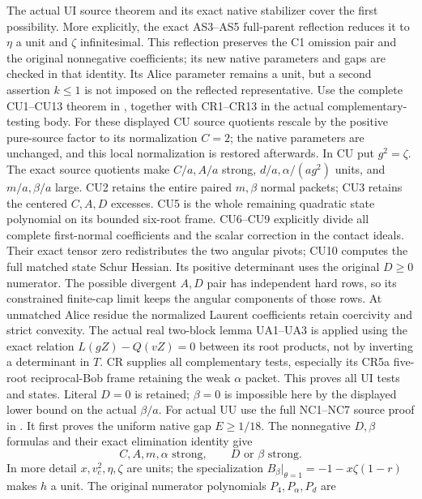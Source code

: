 The actual UI source theorem and its exact native stabilizer cover
the first possibility.  More explicitly, the exact AS3--AS5
full-parent reflection reduces it to \(\eta\) a unit and
\(\zeta\) infinitesimal.  This reflection preserves the C1 omission
pair and the original nonnegative coefficients; its new native
parameters and gaps are checked in that identity.  Its Alice
parameter remains a unit, but a second assertion \(k\leq1\) is
not imposed on the reflected representative.
Use the complete CU1--CU13 theorem in
, together with CR1--CR13 in the actual
complementary-testing body.  For these displayed CU source
quotients rescale by the positive pure-source factor to its
normalization \(C=2\); the native parameters are unchanged,
and this local normalization is restored afterwards.
In CU put \(g^2=\zeta\).
The exact source quotients make \(C/a,A/a\) strong,
\(d/a,\alpha/(ag^2)\) units, and \(m/a,\beta/a\) large.
CU2 retains the entire paired \(m,\beta\) normal packets;
CU3 retains the centered \(C,A,D\) excesses.
CU5 is the whole remaining quadratic state polynomial on
its bounded six-root frame.  CU6--CU9 explicitly divide all
complete first-normal coefficients and the scalar correction in the
contact ideals.  Their exact tensor zero redistributes the
two angular pivots; CU10 computes the full matched state
Schur Hessian.  Its positive determinant uses the original
\(D\geq0\) numerator.  The possible divergent \(A,D\) pair has
independent hard rows, so its constrained finite-cap limit
keeps the angular components of those rows.
At unmatched Alice residue the normalized Laurent coefficients
retain coercivity and strict convexity.  The actual real
two-block lemma UA1--UA3 is applied using the exact relation
\(L(gZ)-Q(vZ)=0\) between its root products, not by inverting
a determinant in \(T\).  CR supplies all complementary tests,
especially its CR5a five-root reciprocal-Bob frame retaining
the weak \(\alpha\) packet.  This proves all UI tests and states.
Literal \(D=0\) is retained; \(\beta=0\) is impossible here by
the displayed lower bound on the actual \(\beta/a\).
For actual UU use the full NC1--NC7 source proof in
.
It first proves the uniform native gap \(E\geq1/18\).
The nonnegative \(D,\beta\) formulas and their exact elimination
identity give
\[
 C,A,m,\alpha\text{ strong},\qquad
                    D\text{ or }\beta\text{ strong}.
\tag{LC7}
\]
In more detail \(x,v_c^2,\eta,\zeta\) are units; the specialization
\(B_\beta|_{\theta=1}=-1-x\zeta(1-r)\) makes \(h\) a unit.
The original numerator polynomials \(P_4,P_\alpha,P_d\) are
